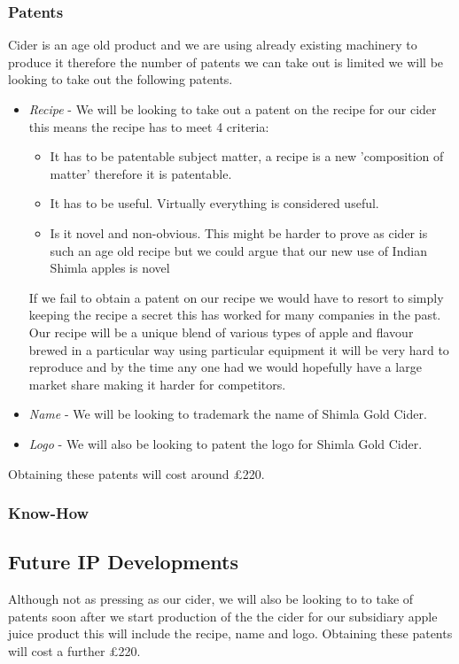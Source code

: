 \documentclass[11pt]{article}
\begin{document}
    \subsubsection{Patents}
    Cider is an age old product and we are using already existing machinery to 
    produce it therefore the number of patents we can take out is limited we will
    be looking to take out the following patents.
    \begin{itemize}
    	\item
	\emph{Recipe} - We will be looking to take out a patent on the recipe for
	our cider this means the recipe has to meet 4 criteria:
 	\begin{itemize}
		\item
		It has to be patentable subject matter, a recipe is a new 'composition of matter' therefore it is patentable.
		\item
		It has to be useful. Virtually everything is considered useful.
		\item
		Is it novel and non-obvious. This might be harder to prove as cider is such an age old recipe but we could argue that our new use of Indian Shimla apples is novel
	\end{itemize}
	If we fail to obtain a patent on our recipe we would have to resort to simply keeping the recipe a secret this has worked for many companies in the past. Our recipe will be a unique blend of various types of apple and flavour brewed in a particular way using particular equipment it will be very hard to reproduce and by the time any one had we would hopefully have a large market share making it harder for competitors. 
	\item
	\emph{Name} - We will be looking to trademark the name of Shimla Gold Cider.
	\item
	\emph{Logo} - We will also be looking to patent the logo for Shimla Gold Cider.
    \end{itemize}
    Obtaining these patents will cost around £220.
    \subsubsection{Know-How}
  \subsection{Future IP Developments}
Although not as pressing as our cider, we will also be looking to to take of patents soon after we start production of the the cider for our subsidiary apple juice product this will include the recipe, name and logo. Obtaining these patents will cost a further £220. 
\newpage
\end{document}
